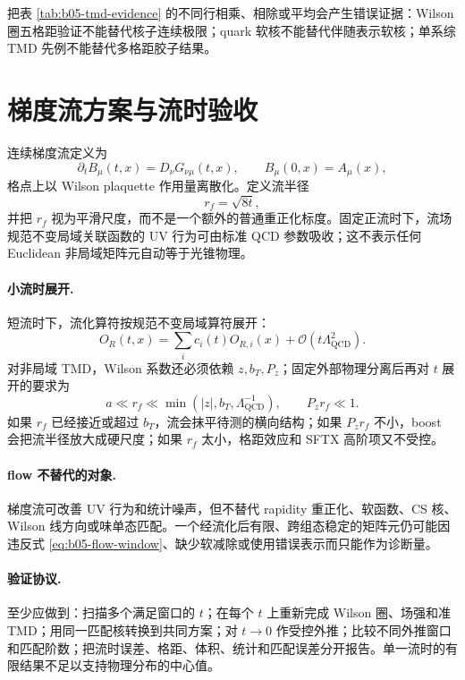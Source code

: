 把表 \ref{tab:b05-tmd-evidence} 的不同行相乘、相除或平均会产生错误证据：Wilson 圈五格距验证不能替代核子连续极限；quark 软核不能替代伴随表示软核；单系综 TMD 先例不能替代多格距胶子结果。

\section{梯度流方案与流时验收}

连续梯度流定义为
\begin{equation}
  \partial_tB_\mu(t,x)=D_\nu G_{\nu\mu}(t,x),
  \qquad B_\mu(0,x)=A_\mu(x),
  \label{eq:b05-flow-equation}
\end{equation}
格点上以 Wilson plaquette 作用量离散化。定义流半径
\begin{equation}
  r_f=\sqrt{8t},
  \label{eq:b05-flow-radius}
\end{equation}
并把 \(r_f\) 视为平滑尺度，而不是一个额外的普通重正化标度。固定正流时下，流场规范不变局域关联函数的 UV 行为可由标准 QCD 参数吸收；这不表示任何 Euclidean 非局域矩阵元自动等于光锥物理。

\paragraph{小流时展开.}
短流时下，流化算符按规范不变局域算符展开：
\begin{equation}
  O_R(t,x)
  =\sum_i c_i(t)O_{R,i}(x)
   +\mathcal O(t\Lambda_{\mathrm{QCD}}^2).
  \label{eq:b05-sftx}
\end{equation}
对非局域 TMD，Wilson 系数还必须依赖 \(z,b_T,P_z\)；固定外部物理分离后再对 \(t\) 展开的要求为
\begin{equation}
  a\ll r_f\ll\min\left(|z|,b_T,\Lambda_{\mathrm{QCD}}^{-1}\right),
  \qquad
  P_zr_f\ll1.
  \label{eq:b05-flow-window}
\end{equation}
如果 \(r_f\) 已经接近或超过 \(b_T\)，流会抹平待测的横向结构；如果 \(P_zr_f\) 不小，boost 会把流半径放大成硬尺度；如果 \(r_f\) 太小，格距效应和 SFTX 高阶项又不受控。

\paragraph{flow 不替代的对象.}
梯度流可改善 UV 行为和统计噪声，但不替代 rapidity 重正化、软函数、CS 核、Wilson 线方向或味单态匹配。一个经流化后有限、跨组态稳定的矩阵元仍可能因违反式 \eqref{eq:b05-flow-window}、缺少软减除或使用错误表示而只能作为诊断量。

\paragraph{验证协议.}
至少应做到：扫描多个满足窗口的 \(t\)；在每个 \(t\) 上重新完成 Wilson 圈、场强和准 TMD；用同一匹配核转换到共同方案；对 \(t\to0\) 作受控外推；比较不同外推窗口和匹配阶数；把流时误差、格距、体积、统计和匹配误差分开报告。单一流时的有限结果不足以支持物理分布的中心值。

